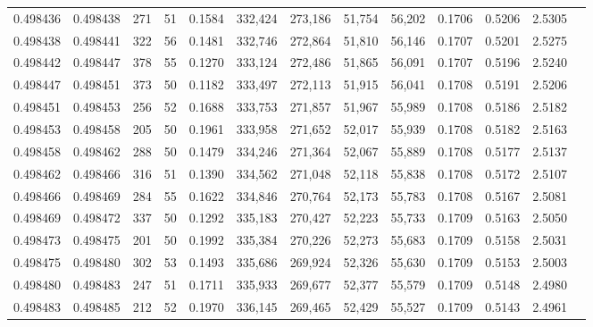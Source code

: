 \begin{tabular}{rrrrrrrrrrrrr}
0.498436 & 0.498438 & 271 &  51 &                                     0.1584 & 332,424 & 273,186 &  51,754 &  56,202 & 0.1706 & 0.5206 & 2.5305 \\
0.498438 & 0.498441 & 322 &  56 &                                     0.1481 & 332,746 & 272,864 &  51,810 &  56,146 & 0.1707 & 0.5201 & 2.5275 \\
0.498442 & 0.498447 & 378 &  55 &                                     0.1270 & 333,124 & 272,486 &  51,865 &  56,091 & 0.1707 & 0.5196 & 2.5240 \\
0.498447 & 0.498451 & 373 &  50 &                                     0.1182 & 333,497 & 272,113 &  51,915 &  56,041 & 0.1708 & 0.5191 & 2.5206 \\
0.498451 & 0.498453 & 256 &  52 &                                     0.1688 & 333,753 & 271,857 &  51,967 &  55,989 & 0.1708 & 0.5186 & 2.5182 \\
0.498453 & 0.498458 & 205 &  50 &                                     0.1961 & 333,958 & 271,652 &  52,017 &  55,939 & 0.1708 & 0.5182 & 2.5163 \\
0.498458 & 0.498462 & 288 &  50 &                                     0.1479 & 334,246 & 271,364 &  52,067 &  55,889 & 0.1708 & 0.5177 & 2.5137 \\
0.498462 & 0.498466 & 316 &  51 &                                     0.1390 & 334,562 & 271,048 &  52,118 &  55,838 & 0.1708 & 0.5172 & 2.5107 \\
0.498466 & 0.498469 & 284 &  55 &                                     0.1622 & 334,846 & 270,764 &  52,173 &  55,783 & 0.1708 & 0.5167 & 2.5081 \\
0.498469 & 0.498472 & 337 &  50 &                                     0.1292 & 335,183 & 270,427 &  52,223 &  55,733 & 0.1709 & 0.5163 & 2.5050 \\
0.498473 & 0.498475 & 201 &  50 &                                     0.1992 & 335,384 & 270,226 &  52,273 &  55,683 & 0.1709 & 0.5158 & 2.5031 \\
0.498475 & 0.498480 & 302 &  53 &                                     0.1493 & 335,686 & 269,924 &  52,326 &  55,630 & 0.1709 & 0.5153 & 2.5003 \\
0.498480 & 0.498483 & 247 &  51 &                                     0.1711 & 335,933 & 269,677 &  52,377 &  55,579 & 0.1709 & 0.5148 & 2.4980 \\
0.498483 & 0.498485 & 212 &  52 &                                     0.1970 & 336,145 & 269,465 &  52,429 &  55,527 & 0.1709 & 0.5143 & 2.4961 \\

\end{tabular}
